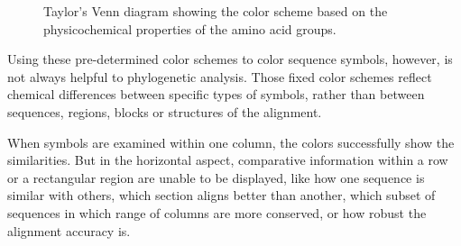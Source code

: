 \begin{figure}[hbt]
\caption[Taylor's Amino Acid Color Scheme]{Taylor's \cite{LIN2002361} Venn diagram showing the color scheme based on the physicochemical properties of the amino acid groups. \cite{Procter2010aa}}\label{fig:procter-2d}
\end{figure}

Using these pre-determined color schemes to color sequence symbols, however, is not always helpful to phylogenetic analysis. Those fixed color schemes reflect chemical differences between specific types of symbols, rather than between sequences, regions, blocks or structures of the alignment.

When symbols are examined within one column, the colors successfully show the similarities. But in the horizontal aspect, comparative information within a row or a rectangular region are unable to be displayed, like how one sequence is similar with others, which section aligns better than another, which subset of sequences in which range of columns are more conserved, or how robust the alignment accuracy is.

